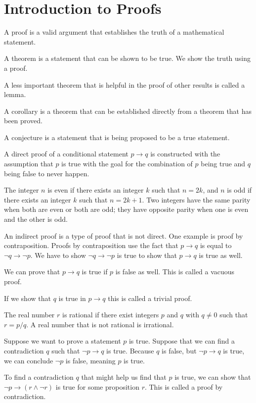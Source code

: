 \documentclass[../discrete.tex]{subfiles}
\begin{document}
\section{Introduction to Proofs}
A proof is a valid argument that establishes the truth of a mathematical statement. 

A theorem is a statement that can be shown to be true. We show the truth using a proof.

A less important theorem that is helpful in the proof of other results is called a lemma. 

A corollary is a theorem that can be established directly from a theorem that has been proved. 

A conjecture is a statement that is being proposed to be a true statement.

A direct proof of a conditional statement $p\rightarrow q$ is constructed with the assumption that $p$ is true with the goal for the combination of $p$ being true and $q$ being false to never happen. 
\begin{definition}
    The integer $n$ is even if there exists an integer $k$ such that $n=2k$, and $n$ is odd if there exists an integer $k$ such that $n=2k+1$. Two integers have the same parity when both are even or both are odd; they have opposite parity when one is even and the other is odd.
\end{definition}
An indirect proof is a type of proof that is not direct. One example is proof by contraposition. Proofs by contraposition use the fact that $p\rightarrow q$ is equal to $\neg q \rightarrow \neg p$. We have to show $\neg q \rightarrow \neg p$ is true to show that $p\rightarrow q$ is true as well.

We can prove that $p\rightarrow q$ is true if $p$ is false as well. This is called a vacuous proof. 

If we show that $q$ is true in $p\rightarrow q$ this is called a trivial proof. 
\begin{definition}
    The real number $r$ is rational if there exist integers $p$ and $q$ with $q\neq 0$ such that $r=p/q$. A real number that is not rational is irrational.
\end{definition}
Suppose we want to prove a statement $p$ is true. Suppose that we can find a contradiction $q$ such that $\neg p \rightarrow q$ is true. Because $q$ is false, but $\neg p \rightarrow q$ is true, we can conclude $\neg p$ is false, meaning $p$ is true. 

To find a contradiction $q$ that might help us find that $p$ is true, we can show that $\neg p \rightarrow (r\land \neg r)$ is true for some proposition $r$. This is called a proof by contradiction. 
\end{document}

